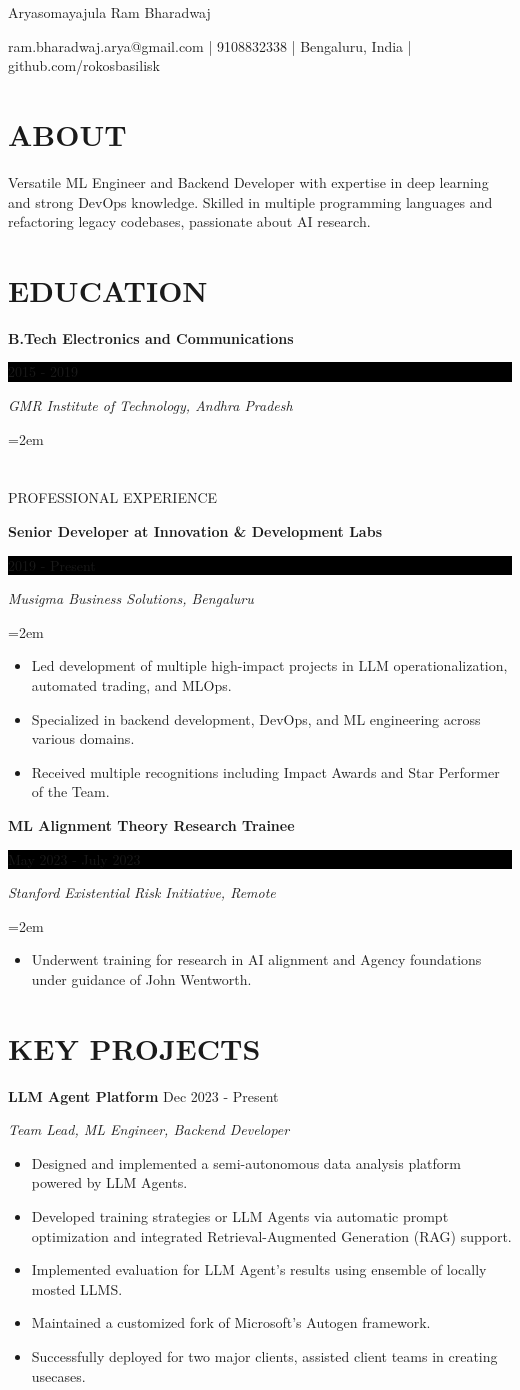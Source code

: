 \documentclass[fontsize=11pt]{article}
\newcommand{\sepspace}{\vspace*{1em}}
\newcommand{\MyName}[1]{
    \Huge \usefont{OT1}{phv}{b}{n} \hfill #1
    \par \normalsize \normalfont}
\newcommand{\NewPart}[1]{\section*{\uppercase{#1}}}
\newcommand{\EducationEntry}[4]{
    \noindent \textbf{#1} \hfill
    \colorbox{Black}{\parbox{8.5em}{\hfill\color{White}#2}} \par
    \noindent \textit{#3} \par
    \noindent\hangindent=2em\hangafter=0 \small #4
    \normalsize \par}
\newcommand{\WorkEntry}[4]{
    \noindent \textbf{#1} \hfill
    \colorbox{Black}{\parbox{9em}{\hfill\color{White}#2}} \par
    \noindent \textit{#3} \par
    \noindent\hangindent=2em\hangafter=0 \small #4
    \normalsize \par}
\newcommand{\ProjectEntry}[4]{
    \noindent \textbf{#1} \hfill {#2} \par
    \noindent \textit{#3} \par
    \noindent \small #4
    \normalsize \par}
\newcommand{\AboutEntry}[1]{
    \noindent #1 \par}
\begin{document}
\MyName{Aryasomayajula Ram Bharadwaj}
\bigskip

{\small \hfill ram.bharadwaj.arya@gmail.com | 9108832338 | Bengaluru, India | github.com/rokosbasilisk}

\NewPart{ABOUT}
\AboutEntry{Versatile ML Engineer and Backend Developer with expertise in deep learning and strong DevOps knowledge. Skilled in multiple programming languages and refactoring legacy codebases, passionate about AI research.}

\NewPart{EDUCATION}
\EducationEntry
{B.Tech Electronics and Communications}
{2015 - 2019}
{GMR Institute of Technology, Andhra Pradesh}

\NewPart{PROFESSIONAL EXPERIENCE}

\WorkEntry
{Senior Developer at Innovation \& Development Labs}
{2019 - Present}
{Musigma Business Solutions, Bengaluru}
{%
\begin{itemize}
\item Led development of multiple high-impact projects in LLM operationalization, automated trading, and MLOps.
\item Specialized in backend development, DevOps, and ML engineering across various domains.
\item Received multiple recognitions including Impact Awards and Star Performer of the Team.
\end{itemize}}

\sepspace

\WorkEntry
{ML Alignment Theory Research Trainee}
{May 2023 - July 2023}
{Stanford Existential Risk Initiative, Remote}
{%
\begin{itemize}
    \item Underwent training for research in AI alignment and Agency foundations under guidance of John Wentworth.
\end{itemize}}

\NewPart{KEY PROJECTS}

\ProjectEntry{LLM Agent Platform}{Dec 2023 - Present}{Team Lead, ML Engineer, Backend Developer}
{%
\begin{itemize}
\item Designed and implemented a semi-autonomous data analysis platform powered by LLM Agents.
\item Developed training strategies or LLM Agents via automatic prompt optimization and integrated Retrieval-Augmented Generation (RAG) support.
\item Implemented evaluation for LLM Agent's results using ensemble of locally mosted LLMS.
\item Maintained a customized fork of Microsoft's Autogen framework.
\item Successfully deployed for two major clients, assisted client teams in creating usecases.
\end{itemize}}
\end{document}
